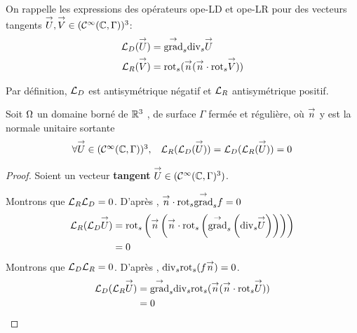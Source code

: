   \begin{defn}
    On rappelle les expressions des opérateurs \gls{ope-LD} et \gls{ope-LR} pour des vecteurs tangents \(\vect U,\vect V \in (\mathcal{C}^\infty(\CC,\Gamma))^3\): 
    \begin{align*}
      \LD(\vect U) &= \tgrads \tdivs \vect U\\
      \LR(\vect V) &= \trots( \vn ( \vn \cdot \trots \vect V))
    \end{align*}
  \end{defn}

  \begin{prop}
    Par définition, \(\LD\) est antisymétrique négatif et \(\LR\) antisymétrique positif.
  \end{prop}

  \begin{prop}
    Soit \(\OO\) un domaine borné de \(\RR^3\) , de surface \(\Gamma\) fermée et régulière, où \(\vect n\) y est la normale unitaire
    sortante
    \begin{equation}
      \begin{matrix}
        \forall \vect U \in (\mathcal{C}^\infty(\CC,\Gamma))^3 ,& \LR(\LD(\vect U)) = \LD(\LR(\vect U)) = 0
      \end{matrix}
    \end{equation}
  \end{prop}
  \begin{proof}

    Soient un vecteur \textbf{tangent} \(\vect U \in (\mathcal{C}^\infty(\CC,\Gamma)^3)\). 

    Montrons que \(\LR\LD = 0\).
    D’après \cite[p.~1029, A3.42]{bladel_electromagnetic_2007}, \(\vn \cdot \trots\tgrads f = 0\)
    \begin{align*}
      \LR(\LD \vect U)  &= \trots \left(\vn \left(\vn \cdot \trots \left( \tgrads \left(\tdivs \vect U\right)\right)\right)\right) \\
      &= 0
    \end{align*}
    Montrons que \(\LD\LR = 0\).
    D’après \cite[p.~1029, A3.43]{bladel_electromagnetic_2007}, \(\tdivs \trots (f\vn) = 0\).
    \begin{align*}
      \LD(\LR \vect U) &= \tgrads \tdivs \trots (\vn (\vn \cdot \trots \vect U)) \\
      &= 0
    \end{align*}
  \end{proof}

